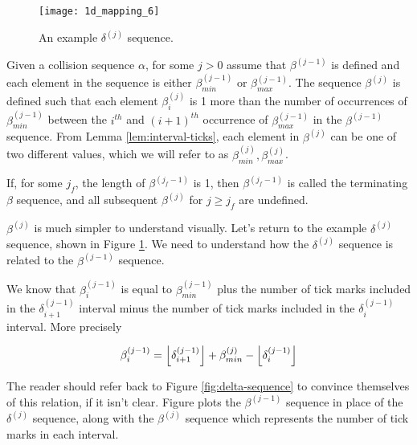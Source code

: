 \begin{figure}[H]
  \begin{center}
    \texttt{[image: 1d\_mapping\_6]}
  \end{center}
  \vspace{-.2in} %
  \caption{\label{fig:delta-sequence-2} An example $\delta^{(j)}$ sequence.}
\end{figure}

\begin{definition}
  \label{def:beta-definition}
  Given a collision sequence $\alpha$, for some $j > 0$ assume that $\beta^{(j-1)}$ is defined and each element in the sequence is either $\beta^{(j-1)}_{min}$ or $\beta^{(j-1)}_{max}$. The sequence $\beta^{(j)}$ is defined such that each element $\beta^{(j)}_i$ is 1 more than the number of occurrences of $\beta^{(j-1)}_{min}$ between the $i^{th}$ and $(i+1)^{th}$ occurrence of $\beta^{(j-1)}_{max}$ in the $\beta^{(j-1)}$ sequence. From Lemma \ref{lem:interval-ticks}, each element in $\beta^{(j)}$ can be one of two different values, which we will refer to as $\beta^{(j)}_{min}, \beta^{(j)}_{max}$.

  If, for some $j_f$, the length of $\beta^{(j_f-1)}$ is 1, then $\beta^{(j_f-1)}$ is called the terminating $\beta$ sequence, and all subsequent $\beta^{(j)}$ for $j \ge j_f$ are undefined.
\end{definition}

$\beta^{(j)}$ is much simpler to understand visually. Let's return to the example $\delta^{(j)}$ sequence, shown in Figure \ref{fig:delta-sequence-2}. We need to understand how the $\delta^{(j)}$ sequence is related to the $\beta^{(j-1)}$ sequence. 

We know that $\beta^{(j-1)}_i$ is equal to $\beta^{(j-1)}_{min}$ plus the number of tick marks included in the $\delta^{(j-1)}_{i+1}$ interval minus the number of tick marks included in the $\delta^{(j-1)}_i$ interval. More precisely

\begin{align}\label{eq:beta_i}
  \beta^{(j-1)}_i = \floor{\delta^{(j-1)}_{i+1}} + \beta^{(j)}_{min} - \floor{\delta^{(j-1)}_i} 
\end{align}

The reader should refer back to Figure \ref{fig:delta-sequence} to convince themselves of this relation, if it isn't clear. Figure plots the $\beta^{(j-1)}$ sequence in place of the $\delta^{(j)}$ sequence, along with the $\beta^{(j)}$ sequence which represents the number of tick marks in each interval.

